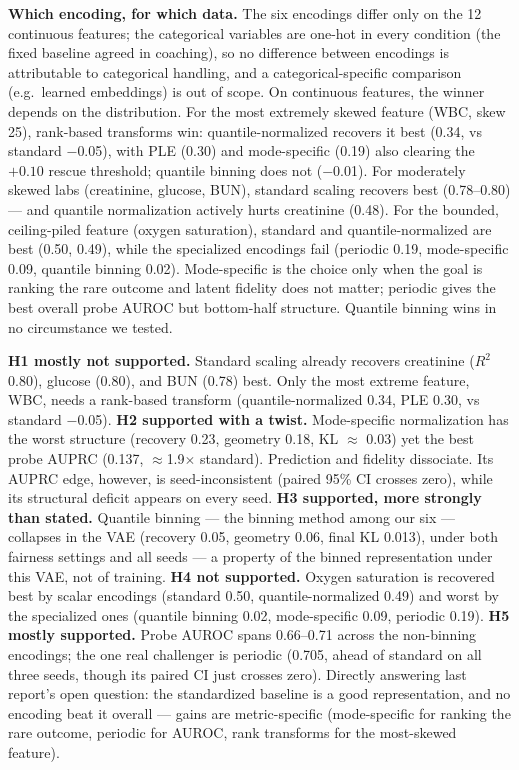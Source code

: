 \documentclass[onecolumn]{sigchi}
\begin{document}
\textbf{Which encoding, for which data.} The six encodings differ only
on the 12 continuous features; the categorical variables are one-hot in
every condition (the fixed baseline agreed in coaching), so no difference
between encodings is attributable to categorical handling, and a
categorical-specific comparison (e.g.\ learned embeddings) is out of
scope. On continuous features, the winner depends on the distribution.
For the most extremely skewed feature (WBC, skew 25), rank-based
transforms win: quantile-normalized recovers it best (0.34, vs standard
$-$0.05), with PLE (0.30) and mode-specific (0.19) also clearing the
$+0.10$ rescue threshold; quantile binning does not ($-$0.01). For
moderately skewed labs (creatinine, glucose, BUN), standard scaling
recovers best (0.78--0.80) --- and quantile normalization actively hurts
creatinine (0.48). For the bounded, ceiling-piled feature (oxygen
saturation), standard and quantile-normalized are best (0.50, 0.49),
while the specialized encodings fail (periodic 0.19, mode-specific 0.09,
quantile binning 0.02). Mode-specific is the choice only when the goal is
ranking the rare outcome and latent fidelity does not matter; periodic
gives the best overall probe AUROC but bottom-half structure. Quantile
binning wins in no circumstance we tested.

\textbf{H1 mostly not supported.} Standard scaling already recovers
creatinine ($R^2$ 0.80), glucose (0.80), and BUN (0.78) best. Only the most
extreme feature, WBC, needs a rank-based transform (quantile-normalized
0.34, PLE 0.30, vs standard $-$0.05).
\textbf{H2 supported with a twist.} Mode-specific normalization has the
worst structure (recovery 0.23, geometry 0.18, KL $\approx$ 0.03) yet the
best probe AUPRC (0.137, $\approx$1.9$\times$ standard). Prediction and
fidelity dissociate. Its AUPRC edge, however, is seed-inconsistent (paired
95\% CI crosses zero), while its structural deficit appears on every seed.
\textbf{H3 supported, more strongly than stated.} Quantile binning
--- the binning method among our six --- collapses in the VAE (recovery
0.05, geometry 0.06, final KL 0.013), under both fairness settings and
all seeds --- a property of the binned representation under this VAE,
not of training.
\textbf{H4 not supported.} Oxygen saturation is recovered best by
scalar encodings (standard 0.50, quantile-normalized 0.49) and worst by
the specialized ones (quantile binning 0.02, mode-specific 0.09, periodic
0.19).
\textbf{H5 mostly supported.} Probe AUROC spans 0.66--0.71 across the
non-binning encodings; the one real challenger is periodic (0.705, ahead
of standard on all three seeds, though its paired CI just crosses zero).
Directly answering last report's open question: the standardized baseline
is a good representation, and no encoding beat it overall --- gains are
metric-specific (mode-specific for ranking the rare outcome, periodic for
AUROC, rank transforms for the most-skewed feature).
\end{document}
